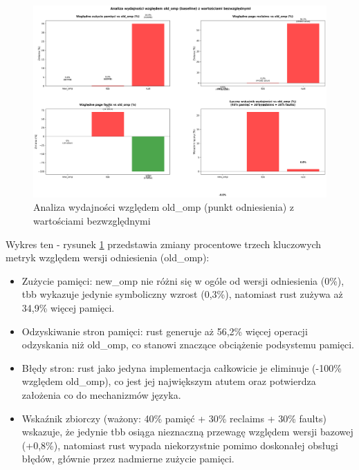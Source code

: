 \begin{figure}[H]
    \centering
    \includegraphics[width=\textwidth]{analiza/images/parallel/is/arm/chart_05_performance_ratios.png}
    \caption{Analiza wydajności względem old\_omp (punkt odniesienia) z wartościami bezwzględnymi}
    \label{is_analiza_wzgledem_old_omp}
\end{figure}
Wykres ten - rysunek \ref{is_analiza_wzgledem_old_omp} przedstawia zmiany procentowe trzech kluczowych metryk względem wersji odniesienia (old\_omp):
\begin{itemize}
    \item Zużycie pamięci: new\_omp nie różni się w ogóle od wersji odniesienia (0\%), tbb wykazuje jedynie symboliczny wzrost (0,3\%), natomiast rust zużywa aż 34,9\% więcej pamięci.
    \item Odzyskiwanie stron pamięci: rust generuje aż 56,2\% więcej operacji odzyskania niż old\_omp, co stanowi znaczące obciążenie podsystemu pamięci.
    \item Błędy stron: rust jako jedyna implementacja całkowicie je eliminuje (-100\% względem old\_omp), co jest jej największym atutem oraz potwierdza założenia co do mechanizmów języka.
    \item Wskaźnik zbiorczy (ważony: 40\% pamięć + 30\% reclaims + 30\% faults) wskazuje, że jedynie tbb osiąga nieznaczną przewagę względem wersji bazowej (+0,8\%), natomiast rust wypada niekorzystnie pomimo doskonałej obsługi błędów, głównie przez nadmierne zużycie pamięci.
\end{itemize}



